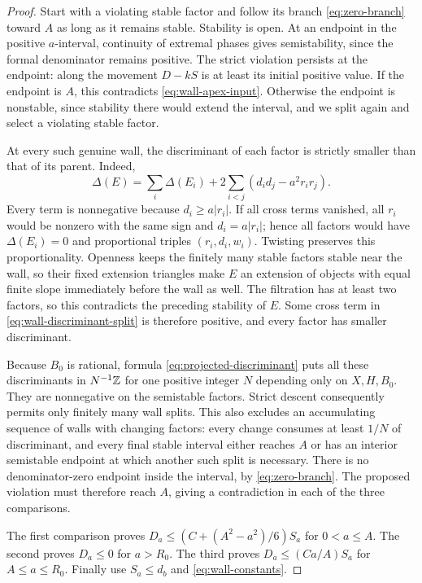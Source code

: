 \begin{proof}
Start with a violating stable factor and follow its branch
\eqref{eq:zero-branch} toward $A$ as long as it remains stable.
Stability is open.  At an endpoint in the positive $a$-interval,
continuity of extremal phases gives semistability, since the formal
denominator remains positive.  The strict violation persists at the
endpoint: along the movement $D-kS$ is at least its initial positive
value.  If the endpoint is $A$, this contradicts
\eqref{eq:wall-apex-input}.  Otherwise the endpoint is nonstable,
since stability there would extend the interval, and we split again
and select a violating stable factor.

At every such genuine wall, the discriminant of each factor is
strictly smaller than that of its parent.  Indeed,
\begin{equation}\label{eq:wall-discriminant-split}
 \Delta(E)=\sum_i\Delta(E_i)+
    2\sum_{i<j}(d_i d_j-a^2r_i r_j).
\end{equation}
Every term is nonnegative because $d_i\ge a|r_i|$.
If all cross terms vanished, all $r_i$ would be nonzero with the
same sign and $d_i=a|r_i|$; hence all factors would have
$\Delta(E_i)=0$ and proportional triples $(r_i,d_i,w_i)$.
Twisting preserves this proportionality.  Openness keeps the
finitely many stable factors stable near the wall, so their fixed
extension triangles make $E$ an extension of objects with equal
finite slope immediately before the wall as well.  The filtration
has at least two factors, so this contradicts the preceding stability
of $E$.  Some cross term in \eqref{eq:wall-discriminant-split} is
therefore positive, and every factor has smaller discriminant.

Because $B_0$ is rational, formula
\eqref{eq:projected-discriminant} puts all these discriminants in
$N^{-1}\mathbb Z$ for one positive integer $N$ depending only on
$X,H,B_0$.  They are nonnegative on the semistable factors.
Strict descent consequently permits only finitely many wall splits.
This also excludes an accumulating sequence of walls with changing
factors: every change consumes at least $1/N$ of discriminant, and
every final stable interval either reaches $A$ or has an interior
semistable endpoint at which another such split is necessary.
There is no denominator-zero endpoint inside the interval, by
\eqref{eq:zero-branch}.  The proposed violation must therefore reach
$A$, giving a contradiction in each of the three comparisons.

The first comparison proves
$D_a\le(C+(A^2-a^2)/6)S_a$ for $0<a\le A$.
The second proves $D_a\le0$ for $a>R_0$.
The third proves $D_a\le(Ca/A)S_a$ for $A\le a\le R_0$.
Finally use $S_a\le d_b$ and \eqref{eq:wall-constants}.
\end{proof}

